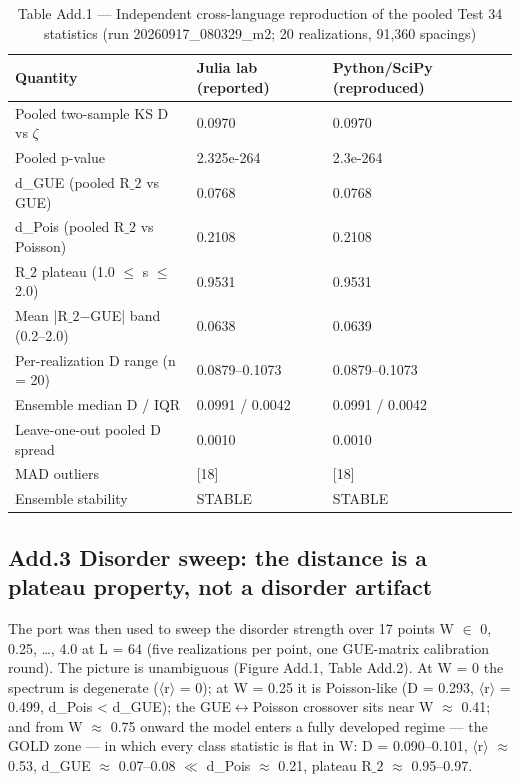\documentclass[10pt]{article}
\begin{document}
\begin{table}[tbp]\centering\small
\caption{Table Add.1 --- Independent cross-language reproduction of the pooled Test 34 statistics (run 20260917\_080329\_m2; 20 realizations, 91,360 spacings)}
\begin{tabular}{lll}
\toprule
Quantity & Julia lab (reported) & Python/SciPy (reproduced) \\
\midrule
Pooled two-sample KS D vs $\zeta$ & 0.0970 & 0.0970 \\
Pooled p-value & 2.325e-264 & 2.3e-264 \\
d\_GUE (pooled R$\_2$ vs GUE) & 0.0768 & 0.0768 \\
d\_Pois (pooled R$\_2$ vs Poisson) & 0.2108 & 0.2108 \\
R$\_2$ plateau (1.0 $\le$ s $\le$ 2.0) & 0.9531 & 0.9531 \\
Mean |R$\_2$$-$GUE| band (0.2--2.0) & 0.0638 & 0.0639 \\
Per-realization D range (n = 20) & 0.0879--0.1073 & 0.0879--0.1073 \\
Ensemble median D / IQR & 0.0991 / 0.0042 & 0.0991 / 0.0042 \\
Leave-one-out pooled D spread & 0.0010 & 0.0010 \\
MAD outliers & [18] & [18] \\
Ensemble stability & STABLE & STABLE \\
\bottomrule
\end{tabular}
\end{table}


\subsection{Add.3 Disorder sweep: the distance is a plateau property, not a disorder artifact}


The port was then used to sweep the disorder strength over 17 points W $\in$ {0, 0.25, \ldots, 4.0} at L = 64 (five realizations per point, one GUE-matrix calibration round). The picture is unambiguous (Figure Add.1, Table Add.2). At W = 0 the spectrum is degenerate ($\langle$r$\rangle$ = 0); at W = 0.25 it is Poisson-like (D = 0.293, $\langle$r$\rangle$ = 0.499, d\_Pois < d\_GUE); the GUE$\leftrightarrow$Poisson crossover sits near W $\approx$ 0.41; and from W $\approx$ 0.75 onward the model enters a fully developed regime --- the GOLD zone --- in which every class statistic is flat in W: D = 0.090--0.101, $\langle$r$\rangle$ $\approx$ 0.53, d\_GUE $\approx$ 0.07--0.08 $\ll$ d\_Pois $\approx$ 0.21, plateau R$\_2$ $\approx$ 0.95--0.97.
\end{document}
